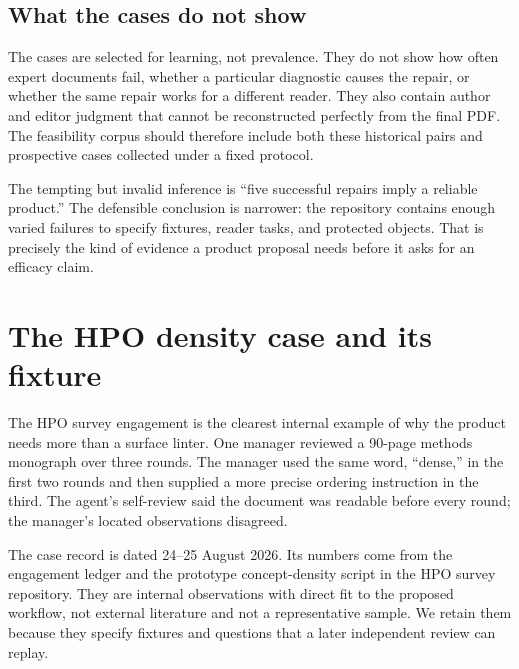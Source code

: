\subsection{What the cases do not show}

The cases are selected for learning, not prevalence. They do not show how
often expert documents fail, whether a particular diagnostic causes the
repair, or whether the same repair works for a different reader. They also
contain author and editor judgment that cannot be reconstructed perfectly from
the final PDF. The feasibility corpus should therefore include both these
historical pairs and prospective cases collected under a fixed protocol.

The tempting but invalid inference is ``five successful repairs imply a
reliable product.'' The defensible conclusion is narrower: the repository
contains enough varied failures to specify fixtures, reader tasks, and
protected objects. That is precisely the kind of evidence a product proposal
needs before it asks for an efficacy claim.

\section{The HPO density case and its fixture}
\label{app:hpo-density-record}

The HPO survey engagement is the clearest internal example of why the product
needs more than a surface linter. One manager reviewed a 90-page methods
monograph over three rounds. The manager used the same word, ``dense,'' in the
first two rounds and then supplied a more precise ordering instruction in the
third. The agent's self-review said the document was readable before every
round; the manager's located observations disagreed.

The case record is dated 24--25 August 2026. Its numbers come from the
engagement ledger and the prototype concept-density script in the HPO survey
repository. They are internal observations with direct fit to the proposed
workflow, not external literature and not a representative sample. We retain
them because they specify fixtures and questions that a later independent
review can replay.

